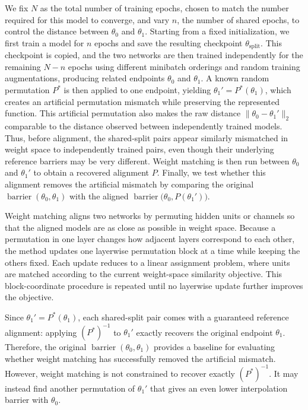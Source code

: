 \documentclass[11pt,a4paper]{report}
\begin{document}
We fix \(N\) as the total number of training epochs, chosen to match the number required for this model to converge, and vary \(n\), the number of shared epochs, to control the distance between \(\theta_0\) and \(\theta_1\). Starting from a fixed initialization, we first train a model for \(n\) epochs and save the resulting checkpoint \(\theta_{\mathrm{split}}\). This checkpoint is copied, and the two networks are then trained independently for the remaining \(N-n\) epochs using different minibatch orderings and random training augmentations, producing related endpoints \(\theta_0\) and \(\theta_1\). A known random permutation $P^\ast$ is then applied to one endpoint, yielding $\theta_1' = P^\ast(\theta_1)$, which creates an artificial permutation mismatch while preserving the represented function. This artificial permutation also makes the raw distance $\|\theta_0 - \theta_1'\|_2$ comparable to the distance observed between independently trained models. Thus, before alignment, the shared-split pairs appear similarly mismatched in weight space to independently trained pairs, even though their underlying reference barriers may be very different. Weight matching is then run between $\theta_0$ and $\theta_1'$ to obtain a recovered alignment $P$. Finally, we test whether this alignment removes the artificial mismatch by comparing the original \(\operatorname{barrier}(\theta_0,\theta_1)\) with the aligned \(\operatorname{barrier}\bigl(\theta_0,P(\theta_1')\bigr)\).

Weight matching aligns two networks by permuting hidden units or channels so that the aligned models are as close as possible in weight space. Because a permutation in one layer changes how adjacent layers correspond to each other, the method updates one layerwise permutation block at a time while keeping the others fixed. Each update reduces to a linear assignment problem, where units are matched according to the current weight-space similarity objective. This block-coordinate procedure is repeated until no layerwise update further improves the objective.

Since \(\theta_1' = P^\ast(\theta_1)\), each shared-split pair comes with a guaranteed reference alignment: applying \((P^\ast)^{-1}\) to \(\theta_1'\) exactly recovers the original endpoint \(\theta_1\). Therefore, the original \(\operatorname{barrier}(\theta_0,\theta_1)\) provides a baseline for evaluating whether weight matching has successfully removed the artificial mismatch. However, weight matching is not constrained to recover exactly \((P^\ast)^{-1}\). It may instead find another permutation of \(\theta_1'\) that gives an even lower interpolation barrier with \(\theta_0\).
\end{document}
